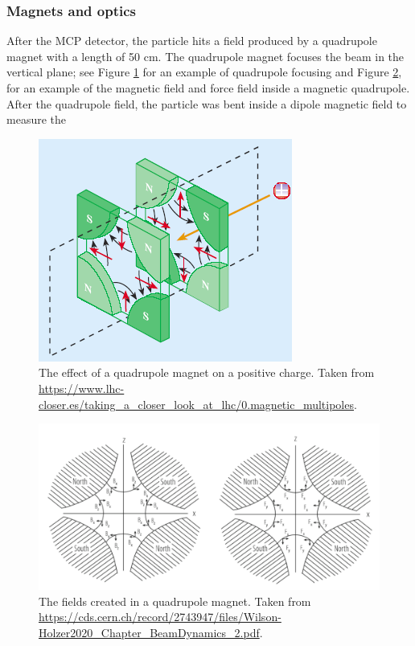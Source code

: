 \documentclass{article}
\begin{document}
\subsubsection{Magnets and optics}
After the MCP detector, the particle hits a field produced by a quadrupole magnet with a length of 50 cm.
The quadrupole magnet focuses the beam in the vertical plane; see Figure \ref{fig:QuadMag} for an example of quadrupole focusing and Figure \ref{fig:QuadMagField}, for an example of the magnetic field and force field inside a magnetic quadrupole.
After the quadrupole field, the particle was bent inside a dipole magnetic field to measure the 
\begin{figure}[htbp!]
    \centering
    \includegraphics[width=0.4\linewidth]{Figures/PRISMA/MagnetsOptics/QuadrupoleMagnet.png}
    \caption{The effect of a quadrupole magnet on a positive charge. Taken from \url{https://www.lhc-closer.es/taking_a_closer_look_at_lhc/0.magnetic_multipoles}.}
    \label{fig:QuadMag}
\end{figure}
\begin{figure}[htbp!]
    \centering
    \includegraphics[width=0.8\linewidth]{Figures/PRISMA/MagnetsOptics/QuadrpoleMagnetsField.pdf}
    \caption{The fields created in a quadrupole magnet. Taken from \url{https://cds.cern.ch/record/2743947/files/Wilson-Holzer2020_Chapter_BeamDynamics_2.pdf}.}
    \label{fig:QuadMagField}
\end{figure}
\end{document}
